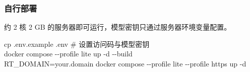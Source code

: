 \subsubsection{自行部署}

约 2 核 2 GB 的服务器即可运行，模型密钥只通过服务器环境变量配置。

\begin{tcolorbox}[colback=rtpaper,colframe=rtpaper,arc=3pt,left=8pt,right=8pt,top=4pt,bottom=4pt]
\small\ttfamily cp .env.example .env \# 设置访问码与模型密钥\\
docker compose -{}-profile lite up -d -{}-build\\
RT\_DOMAIN=your.domain docker compose -{}-profile lite -{}-profile https up -d
\end{tcolorbox}

